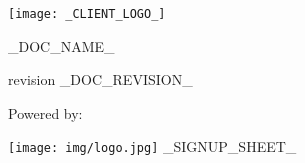 \pagestyle{fancy}

\texttt{[image: \_CLIENT\_LOGO\_]}

\vspace{80px}

\centerline{\Huge _DOC_NAME_}

\vspace{40px}

\centerline{\large revision _DOC_REVISION_}

\vspace{80px}

\centerline{\huge Powered by:}
\texttt{[image: img/logo.jpg]}
_SIGNUP_SHEET_
\newpage
